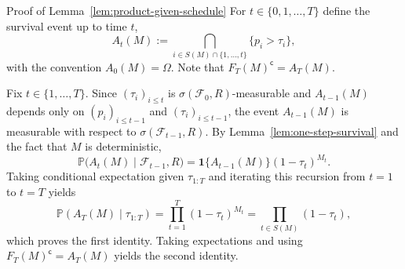 \documentclass{uai2026} %
\newcommand{\1}{\mathbf{1}}
\newcommand{\ind}[1]{\mathbf{1}\{#1\}}
\newcommand{\prob}{\mathbb{P}}
\newcommand{\F}{\mathcal{F}}
\begin{document}
\begin{appendixproof}{Proof of Lemma~\ref{lem:product-given-schedule}}
  For $t\in\{0,1,\dots,T\}$ define the survival event up to time $t$,
  \begin{equation*}
    A_{t}(M):=\bigcap_{i\in S(M)\cap\{1,\dots,t\}}\{p_{i}>\tau_{i}\},
  \end{equation*}
  with the convention $A_{0}(M)=\Omega$.
  Note that $F_{T}(M)^{\mathsf{c}}=A_{T}(M)$.

  Fix $t\in\{1,\dots,T\}$.
  Since $(\tau_{i})_{i\le t}$ is $\sigma(\F_{0},R)$-measurable and $A_{t-1}(M)$ depends only on $(p_{i})_{i\le t-1}$ and $(\tau_{i})_{i\le t-1}$, the event $A_{t-1}(M)$ is measurable with respect to $\sigma(\F_{t-1},R)$.
  By Lemma~\ref{lem:one-step-survival} and the fact that $M$ is deterministic,
  \begin{equation*}
    \prob\bigl(A_{t}(M)\mid \F_{t-1},R\bigr)
    =
    \ind{A_{t-1}(M)}(1-\tau_{t})^{M_{t}}.
  \end{equation*}
  Taking conditional expectation given $\tau_{1:T}$ and iterating this recursion from $t=1$ to $t=T$ yields
  \begin{equation*}
    \prob(A_{T}(M)\mid \tau_{1:T})=\prod_{t=1}^{T}(1-\tau_{t})^{M_{t}}=\prod_{t\in S(M)}(1-\tau_{t}),
  \end{equation*}
  which proves the first identity.
  Taking expectations and using $F_{T}(M)^{\mathsf{c}}=A_{T}(M)$ yields the second identity.
\end{appendixproof}
\end{document}

